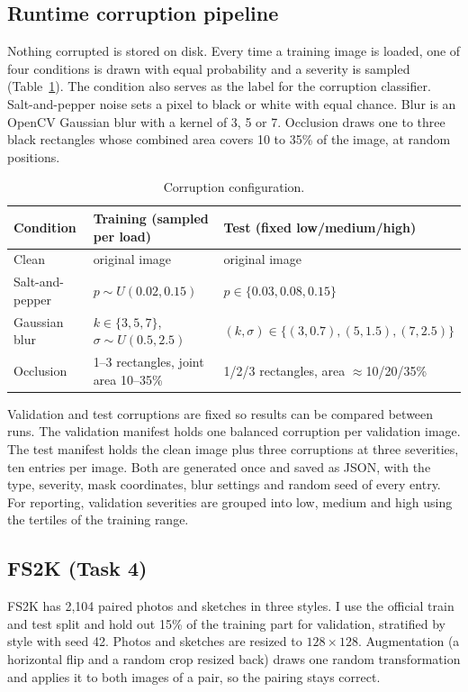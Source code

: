 \documentclass[conference]{IEEEtran}
\let\oldsubsection\subsection
\renewcommand{\subsection}[1]{\oldsubsection{\textbf{#1}}}
\begin{document}
\subsection{Runtime corruption pipeline}
Nothing corrupted is stored on disk. Every time a training image is loaded, one of four conditions is drawn with equal probability and a severity is sampled (Table~\ref{tab:corr}). The condition also serves as the label for the corruption classifier. Salt-and-pepper noise sets a pixel to black or white with equal chance. Blur is an OpenCV Gaussian blur with a kernel of 3, 5 or 7. Occlusion draws one to three black rectangles whose combined area covers 10 to 35\% of the image, at random positions.

\begin{table}[t]
\centering\caption{Corruption configuration.}\label{tab:corr}
\footnotesize
\begin{tabular}{p{1.5cm}p{3.0cm}p{2.9cm}}
\toprule
Condition & Training (sampled per load) & Test (fixed low/medium/high) \\
\midrule
Clean & original image & original image \\
Salt-and-pepper & $p\sim U(0.02,0.15)$ & $p\in\{0.03,0.08,0.15\}$ \\
Gaussian blur & $k\in\{3,5,7\}$, $\sigma\sim U(0.5,2.5)$ & $(k,\sigma)\in\{(3,0.7),(5,1.5),(7,2.5)\}$ \\
Occlusion & 1--3 rectangles, joint area 10--35\% & 1/2/3 rectangles, area $\approx$10/20/35\% \\
\bottomrule
\end{tabular}
\end{table}

Validation and test corruptions are fixed so results can be compared between runs. The validation manifest holds one balanced corruption per validation image. The test manifest holds the clean image plus three corruptions at three severities, ten entries per image. Both are generated once and saved as JSON, with the type, severity, mask coordinates, blur settings and random seed of every entry. For reporting, validation severities are grouped into low, medium and high using the tertiles of the training range.

\subsection{FS2K (Task 4)}
FS2K \cite{fan2022fs2k} has 2{,}104 paired photos and sketches in three styles. I use the official train and test split and hold out 15\% of the training part for validation, stratified by style with seed 42. Photos and sketches are resized to $128\times128$. Augmentation (a horizontal flip and a random crop resized back) draws one random transformation and applies it to both images of a pair, so the pairing stays correct.
\end{document}
